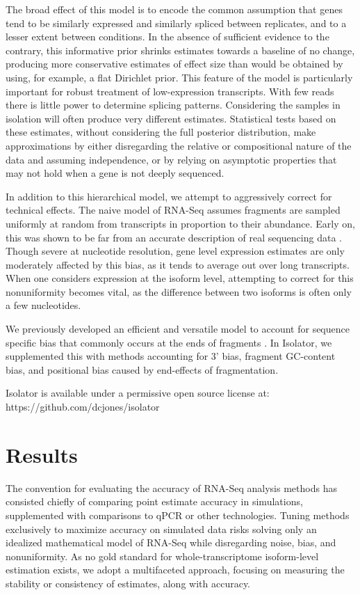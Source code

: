 \documentclass[twocolumn]{article}
\begin{document}
The broad effect of this model is to encode the common assumption that
genes tend to be similarly expressed and similarly spliced between
replicates, and to a lesser extent between conditions. In the absence of
sufficient evidence to the contrary, this informative prior shrinks
estimates towards a baseline of no change, producing more conservative
estimates of effect size than would be obtained by using, for example, a
flat Dirichlet prior. This feature of the model is particularly
important for robust treatment of low-expression transcripts. With few reads
there is little power to determine splicing patterns. Considering the
samples in isolation will often produce very different estimates.
Statistical tests based on these estimates, without considering the full
posterior distribution, make approximations by either
disregarding the relative or compositional nature of the data and
assuming independence, or by relying on asymptotic properties that may
not hold when a gene is not deeply sequenced.

In addition to this hierarchical model, we attempt to aggressively correct for
technical effects. The naive model of RNA-Seq assumes fragments are sampled
uniformly at random from transcripts in proportion to their abundance. Early on,
this was shown to be far from an accurate description of real sequencing data
\cite{Hansen:2010if}. Though severe at nucleotide resolution, gene level
expression estimates are only moderately affected by this bias, as it tends to
average out over long transcripts. When one considers expression at the isoform
level, attempting to correct for this nonuniformity becomes vital, as the
difference between two isoforms is often only a few nucleotides.

We previously developed an efficient and versatile model to account for sequence
specific bias that commonly occurs at the ends of fragments \cite{Jones:2012hg}.
In Isolator, we supplemented this with methods accounting for 3' bias, fragment
GC-content bias, and positional bias caused by end-effects of fragmentation.

Isolator is available under a permissive open source license at:
https://github.com/dcjones/isolator

\section{Results}\label{results}

The convention for evaluating the accuracy of RNA-Seq analysis methods has
consisted chiefly of comparing point estimate accuracy in simulations,
supplemented with comparisons to qPCR or other technologies. Tuning methods
exclusively to maximize accuracy on simulated data risks solving only an
idealized mathematical model of RNA-Seq while disregarding noise, bias, and
nonuniformity. As no gold standard for whole-transcriptome isoform-level
estimation exists, we adopt a multifaceted approach, focusing on measuring
the stability or consistency of estimates, along with accuracy.
\end{document}
